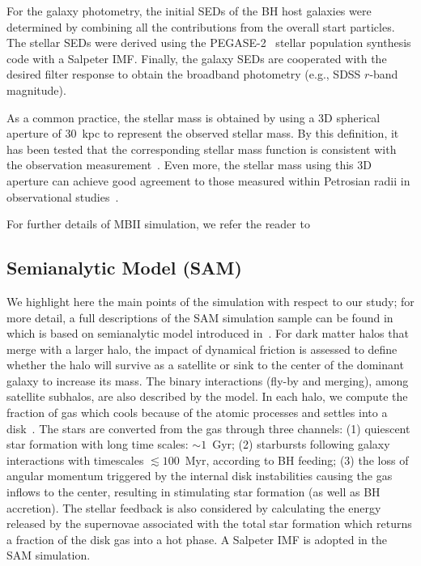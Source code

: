 \documentclass[twocolumn]{aastex631}
\begin{document}
For the galaxy photometry, the initial SEDs of the BH host galaxies were determined by combining all the contributions from the overall start particles. The stellar SEDs were derived using the PEGASE-2~\citep{1999astro.ph.12179F} stellar population synthesis code with a Salpeter IMF. Finally, the galaxy SEDs are  cooperated with the desired filter response to obtain the broadband photometry (e.g., SDSS $r$-band magnitude).

As a common practice, the stellar mass is obtained by using a 3D spherical aperture of 30~kpc to represent the observed stellar mass. By this definition, it has been tested that the corresponding stellar mass function is consistent with the observation measurement~\citep[e.g.,][]{Pillepich2018}. Even more, the stellar mass using this 3D aperture can achieve good agreement to those measured within Petrosian radii in observational studies~\citep{Schaye2015}. 

For further details of MBII simulation, we refer the reader to~\citet{Khandai2015}

\subsection{Semianalytic Model (SAM)}
We highlight here the main points of the simulation with respect to our study; for more detail, a full descriptions of the SAM simulation sample can be found in~\citet{Menci2016} which is based on semianalytic model introduced in~\citet{Menci2014}. For dark matter halos that merge with a larger halo, the impact of dynamical friction is assessed to define whether the halo will survive as a satellite or sink to the center of the dominant galaxy to increase its mass. The binary interactions (fly-by and merging), among satellite subhalos, are  also described by the model. In each halo, we compute the fraction of gas which cools because of the atomic processes and settles into a disk~\citep{Mo1998}. The stars are converted from the gas through three channels: (1) quiescent star formation with long time scales: $\sim1$~Gyr; (2) starbursts following galaxy interactions with timescales $\lesssim 100$~Myr, according to BH feeding; (3) the loss of angular momentum triggered by the internal disk instabilities causing the gas inflows to the center, resulting in stimulating star formation (as well as BH accretion). The stellar feedback is also considered by calculating the energy released by the supernovae associated with the total star formation which returns a fraction of the disk gas into a hot phase. A Salpeter IMF is adopted in the SAM simulation.
\end{document}
